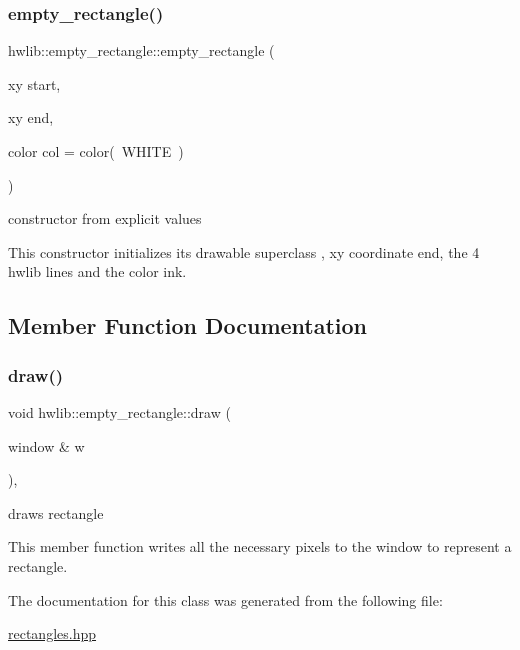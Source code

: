 \subsubsection{\texorpdfstring{empty\+\_\+rectangle()}{empty\_rectangle()}}
{\footnotesize\ttfamily hwlib\+::empty\+\_\+rectangle\+::empty\+\_\+rectangle (\begin{DoxyParamCaption}\item[{xy}]{start,  }\item[{xy}]{end,  }\item[{color}]{col = {\ttfamily color(~WHITE~)} }\end{DoxyParamCaption})\hspace{0.3cm}{\ttfamily [inline]}}



constructor from explicit values 

This constructor initializes its drawable superclass , xy coordinate end, the 4 hwlib lines and the color ink. 

\subsection{Member Function Documentation}
\mbox{\label{classhwlib_1_1empty__rectangle_a1704fd030928cd7929bc1d2300e3ea43}} 
\subsubsection{\texorpdfstring{draw()}{draw()}}
{\footnotesize\ttfamily void hwlib\+::empty\+\_\+rectangle\+::draw (\begin{DoxyParamCaption}\item[{window \&}]{w }\end{DoxyParamCaption})\hspace{0.3cm}{\ttfamily [inline]}, {\ttfamily [override]}}



draws rectangle 

This member function writes all the necessary pixels to the window to represent a rectangle. 

The documentation for this class was generated from the following file\+:\begin{DoxyCompactItemize}
\item 
\hyperlink{rectangles_8hpp}{rectangles.\+hpp}\end{DoxyCompactItemize}
